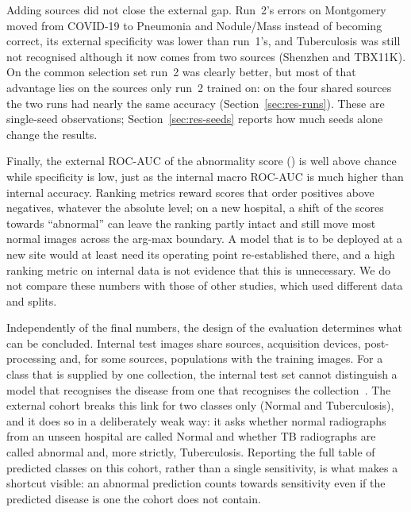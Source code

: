 Adding sources did not close the external gap. Run~2's errors on Montgomery moved from COVID-19 to Pneumonia and Nodule/Mass instead of becoming correct, its external specificity was lower than run~1's, and Tuberculosis was still not recognised although it now comes from two sources (Shenzhen and TBX11K). On the common selection set run~2 was clearly better, but most of that advantage lies on the sources only run~2 trained on: on the four shared sources the two runs had nearly the same accuracy (Section~\ref{sec:res-runs}). These are single-seed observations; Section~\ref{sec:res-seeds} reports how much seeds alone change the results.

Finally, the external ROC-AUC of the abnormality score (\RExtAUC) is well above chance while specificity is low, just as the internal macro ROC-AUC is much higher than internal accuracy. Ranking metrics reward scores that order positives above negatives, whatever the absolute level; on a new hospital, a shift of the scores towards ``abnormal'' can leave the ranking partly intact and still move most normal images across the arg-max boundary. A model that is to be deployed at a new site would at least need its operating point re-established there, and a high ranking metric on internal data is not evidence that this is unnecessary. We do not compare these numbers with those of other studies, which used different data and splits.

Independently of the final numbers, the design of the evaluation determines what can be concluded. Internal test images share sources, acquisition devices, post-processing and, for some sources, populations with the training images. For a class that is supplied by one collection, the internal test set cannot distinguish a model that recognises the disease from one that recognises the collection~\cite{zech2018variable,degrave2021ai,maguolo2020critic}. The external cohort breaks this link for two classes only (Normal and Tuberculosis), and it does so in a deliberately weak way: it asks whether normal radiographs from an unseen hospital are called Normal and whether TB radiographs are called abnormal and, more strictly, Tuberculosis. Reporting the full table of predicted classes on this cohort, rather than a single sensitivity, is what makes a shortcut visible: an abnormal prediction counts towards sensitivity even if the predicted disease is one the cohort does not contain.

